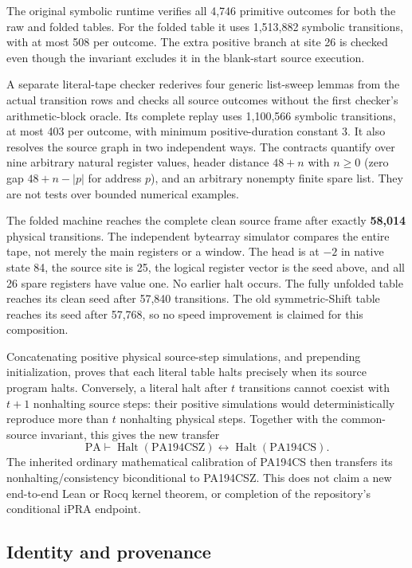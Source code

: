 The original symbolic runtime verifies all 4,746 primitive outcomes for
both the raw and folded tables. For the folded table it uses 1,513,882
symbolic transitions, with at most 508 per outcome. The extra positive
branch at site 26 is checked even though the invariant excludes it in the
blank-start source execution.

A separate literal-tape checker rederives four generic list-sweep lemmas
from the actual transition rows and checks all source outcomes without the
first checker's arithmetic-block oracle. Its complete replay uses 1,100,566
symbolic transitions, at most 403 per outcome, with minimum positive-duration
constant 3. It also resolves the source graph
in two independent ways. The contracts quantify over nine arbitrary natural
register values, header distance $48+n$ with $n\ge0$ (zero gap
$48+n-|p|$ for address $p$),
and an arbitrary nonempty finite spare list. They are not tests over
bounded numerical examples.

The folded machine reaches the complete clean source frame after exactly
\textbf{58,014} physical transitions. The independent bytearray simulator
compares the entire tape, not merely the main registers or a window. The
head is at $-2$ in native state 84, the source site is 25, the logical
register vector is the seed above, and all 26 spare registers have value
one. No earlier halt occurs. The fully unfolded table reaches its clean
seed after 57,840 transitions. The old symmetric-Shift table reaches its
seed after 57,768, so no speed improvement is claimed for this composition.

Concatenating positive physical source-step simulations, and prepending
initialization, proves that each literal table halts precisely when its
source program halts. Conversely, a literal halt after $t$ transitions
cannot coexist with $t+1$ nonhalting source steps: their positive simulations
would deterministically reproduce more than $t$ nonhalting physical steps.
Together with the common-source invariant, this gives the new transfer
\[
 \mathrm{PA}\vdash
 \operatorname{Halt}(\mathrm{PA194CSZ})
 \longleftrightarrow
 \operatorname{Halt}(\mathrm{PA194CS}).
\]
The inherited ordinary mathematical calibration of PA194CS then transfers
its nonhalting/consistency biconditional to PA194CSZ. This does not claim a
new end-to-end Lean or Rocq kernel theorem, or completion of the repository's
conditional iPRA endpoint.

\subsection{Identity and provenance}

